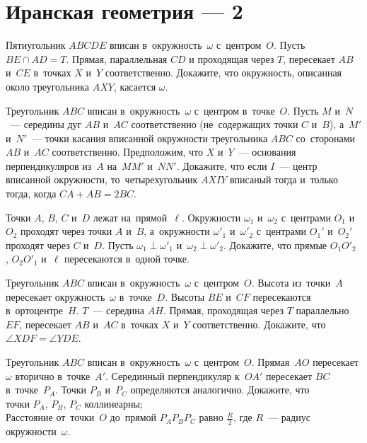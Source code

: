 
\section*{Иранская геометрия --- 2}


\begin{problems}

\item
Пятиугольник $ABCDE$ вписан в~окружность~$\omega$ с~центром~$O$.
Пусть $BE \cap AD = T$.
Прямая, параллельная $CD$ и проходящая через $T$, пересекает $AB$ и~$CE$
в~точках $X$ и~$Y$ соответственно.
Докажите, что окружность, описанная около треугольника $AXY$,
касается $\omega$.

\item
Треугольник $ABC$ вписан в~окружность~$\omega$ с~центром в~точке~$O$.
Пусть $M$ и~$N$~--- середины дуг $AB$ и~$AC$ соответственно
(не~содержащих точки $C$ и~$B$), а~$M'$ и~$N'$~--- точки касания вписанной
окружности треугольника $ABC$ со~сторонами $AB$ и~$AC$
соответственно.
Предположим, что $X$ и~$Y$~--- основания перпендикуляров из~$A$ на~$MM'$
и~$NN'$.
Докажите, что если $I$~--- центр вписанной окружности,
то~четырехугольник $AXIY$ вписаный тогда и~только тогда, когда
$CA + AB = 2 BC$.

\item
Точки $A$, $B$, $C$ и~$D$ лежат на~прямой~$\ell$.
Окружности $\omega_1$ и~$\omega_2$ с~центрами $O_1$ и~$O_2$ проходят через
точки $A$ и~$B$, а~окружности $\omega'_1$ и~$\omega'_2$ с~центрами $O_1'$
и~$O_2'$ проходят через $C$ и~$D$.
Пусть $\omega_1 \perp \omega'_1$ и~$\omega_2 \perp \omega'_2$.
Докажите, что прямые $O_1 O'_2$ , $O_2 O'_1$ и~$\ell$ пересекаются в~одной
точке.

\item
Треугольник $ABC$ вписан в~окружность~$\omega$ с~центром~$O$.
Высота из~точки~$A$ пересекает окружность~$\omega$ в~точке~$D$.
Высоты $BE$ и~$CF$ пересекаются в~ортоцентре~$H$.
$T$~--- середина $AH$.
Прямая, проходящая через $T$ параллельно $EF$, пересекает $AB$ и~$AC$ в~точках
$X$ и~$Y$ соответственно.
Докажите, что $\angle XDF = \angle YDE$.

\item
Треугольник $ABC$ вписан в~окружность~$\omega$ с~центром~$O$.
Прямая~$AO$ пересекает $\omega$ вторично в~точке~$A'$.
Серединный перпендикуляр к~$OA'$ пересекает $BC$ в~точке~$P_A$.
Точки $P_B$ и~$P_C$ определяются аналогично.
Докажите, что
\\
\subproblem
точки $P_A$, $P_B$, $P_C$ коллинеарны;
\\
\subproblem
Расстояние от~точки~$O$ до~прямой $P_A P_B P_C$ равно $\frac{R}{2}$, где
$R$~--- радиус окружности~$\omega$.


\end{problems}

